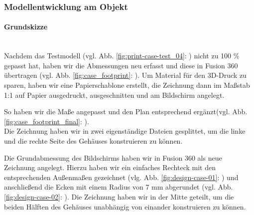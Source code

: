 \subsubsection{Modellentwicklung am Objekt}\label{hw_case_modellentwicklung}
\paragraph{Grundskizze}\\
\noindent Nachdem das Testmodell (vgl. Abb. \ref{fig:print-case-test_04}: ) nicht zu 100 \% gepasst hat, haben wir die Abmessungen neu erfasst und diese in Fusion 360 übertragen (vgl. Abb. \ref{fig:case_footprint}: ). 
Um Material für den 3D-Druck zu sparen, haben wir eine Papierschablone erstellt, die Zeichnung dann im Maßstab 1:1 auf Papier ausgedruckt, ausgeschnitten und am Bildschirm angelegt.\par
\noindent So haben wir die Maße angepasst und den Plan entsprechend ergänzt(vgl. Abb. \ref{fig:case_footprint_final}: ).\\
\noindent Die Zeichnung haben wir in zwei eigenständige Dateien gesplittet, um die linke und die rechte Seite des Gehäuses konstruieren zu können.\par
\noindent Die Grundabmessung des Bildschirms haben wir in Fusion 360 als neue Zeichnung angelegt. 
Hierzu haben wir ein einfaches Rechteck mit den entsprechenden Außenmaßen gezeichnet (vlg. Abb. \ref{fig:design-case-01}: ) und anschließend die Ecken mit einem Radius von 7 mm abgerundet (vgl. Abb. \ref{fig:design-case-02}: ). 
Die Zeichnung haben wir in der Mitte geteilt, um die beiden Hälften des Gehäuses unabhängig von einander konstruieren zu können.\par
